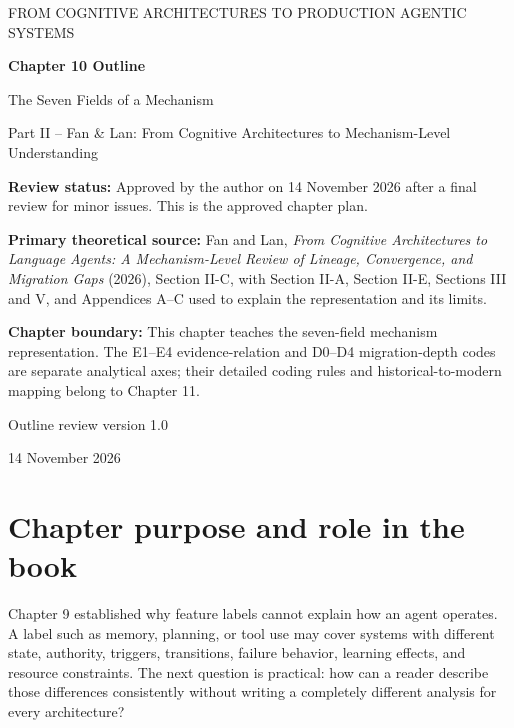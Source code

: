 


\thispagestyle{empty}
\begin{center}
{\sffamily\Large\color{BookBlue} FROM COGNITIVE ARCHITECTURES TO PRODUCTION AGENTIC SYSTEMS\par}
\vspace{1.2cm}
{\sffamily\huge\bfseries\color{BookBlue} Chapter 10 Outline\par}
\vspace{0.45cm}
{\sffamily\LARGE The Seven Fields of a Mechanism\par}
\vspace{0.8cm}
{\large Part II -- Fan \& Lan: From Cognitive Architectures to Mechanism-Level Understanding\par}
\vfill
\begin{learningbox}
\textbf{Review status:} Approved by the author on 14 November 2026 after a final review for minor issues. This is the approved chapter plan.

\textbf{Primary theoretical source:} Fan and Lan, \emph{From Cognitive Architectures to Language Agents: A Mechanism-Level Review of Lineage, Convergence, and Migration Gaps} (2026), Section II-C, with Section II-A, Section II-E, Sections III and V, and Appendices A--C used to explain the representation and its limits.

\textbf{Chapter boundary:} This chapter teaches the seven-field mechanism representation. The E1--E4 evidence-relation and D0--D4 migration-depth codes are separate analytical axes; their detailed coding rules and historical-to-modern mapping belong to Chapter 11.
\end{learningbox}
\vfill
{\sffamily\large Outline review version 1.0\par}
{\small 14 November 2026\par}
\end{center}
\clearpage

\setcounter{chapter}{10}
\section{Chapter purpose and role in the book}
Chapter 9 established why feature labels cannot explain how an agent operates. A label such as memory, planning, or tool use may cover systems with different state, authority, triggers, transitions, failure behavior, learning effects, and resource constraints. The next question is practical: how can a reader describe those differences consistently without writing a completely different analysis for every architecture?

